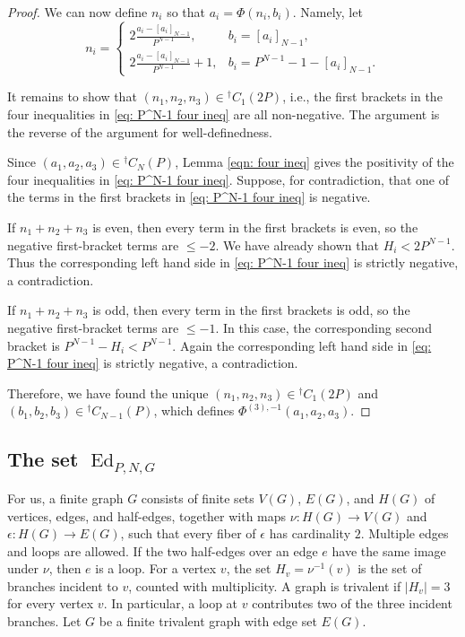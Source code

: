 \documentclass[11pt]{amsart}
\newcommand{\Ed}{\operatorname{Ed}}
\begin{document}
\begin{proof}
We can now define $n_i$ so that $a_i=\Phi(n_i,b_i)$.
Namely, let
\[
        n_i=
        \begin{cases}
        2\frac{a_i-[a_i]_{N-1}}{P^{N-1}},
        & b_i=[a_i]_{N-1},\\[6pt]
        2\frac{a_i-[a_i]_{N-1}}{P^{N-1}}+1,
        & b_i=P^{N-1}-1-[a_i]_{N-1}.
        \end{cases}
\]

It remains to show that $(n_1,n_2,n_3)\in{}^\dagger C_1(2P)$, i.e., the first brackets in the four inequalities in \eqref{eq: P^N-1 four ineq} are all non-negative.  
The argument is the reverse of the argument for well-definedness.

Since
$(a_1,a_2,a_3)\in{}^\dagger C_N(P)$, Lemma \ref{eqn: four ineq} gives the positivity of the four inequalities in \eqref{eq: P^N-1 four ineq}.  Suppose,
for contradiction, that one of the terms in the first brackets in
\eqref{eq: P^N-1 four ineq} is negative.

If $n_1+n_2+n_3$ is even, then every term in the first brackets is even, so
the negative first-bracket terms are $\leq -2$.  We have already shown that $H_i<2P^{N-1}$.
Thus the corresponding left hand side in \eqref{eq: P^N-1 four ineq} is
strictly negative, a contradiction.

If $n_1+n_2+n_3$ is odd, then every term in the first brackets is odd, so the
negative first-bracket terms are $\leq -1$.  In this case, the corresponding second bracket
is  $P^{N-1}-H_i<P^{N-1}$. Again the corresponding left hand side in
\eqref{eq: P^N-1 four ineq} is strictly negative, a contradiction.

Therefore, we have found the unique $(n_1,n_2,n_3)\in {}^\dagger C_1(2P)$ and $(b_1,b_2,b_3)\in {}^\dagger C_{N-1}(P)$, which defines $\Phi^{(3),-1}(a_1,a_2,a_3)$.
\end{proof}


\subsection{The set $\Ed_{P,N,G}$} \label{subsec: global}\;

For us, a finite graph $G$ consists of finite sets $V(G)$, $E(G)$, and $H(G)$ of
vertices, edges, and half-edges, together with maps
$\nu:H(G)\to V(G)$ and $\epsilon:H(G)\to E(G)$,
such that every fiber of $\epsilon$ has cardinality $2$.
Multiple edges and loops are allowed.
If the two half-edges over an edge $e$ have the same image under $\nu$, then
$e$ is a loop.
For a vertex $v$, the set $H_v=\nu^{-1}(v)$
is the set of branches incident to $v$, counted with multiplicity.
A graph is trivalent if $|H_v|=3$ for every vertex $v$.
In particular, a loop at $v$ contributes two of the three incident branches.
Let $G$ be a finite trivalent graph with edge set $E(G)$.
\end{document}
